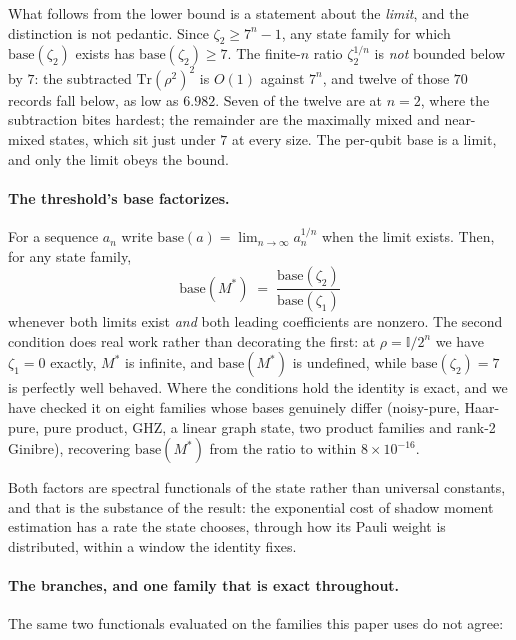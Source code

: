 \documentclass[a4paper,superscriptaddress,nofootinbib,onecolumn,nopdfoutputerror]{quantumarticle}
\begin{document}
What follows from the lower bound is a statement about the \emph{limit}, and the distinction
is not pedantic. Since \(\zeta_2 \ge 7^n - 1\), any state family for which
\(\mathrm{base}(\zeta_2)\) exists has \(\mathrm{base}(\zeta_2) \ge 7\). The finite-\(n\) ratio
\(\zeta_2^{1/n}\) is \emph{not} bounded below by \(7\): the subtracted \(\mathrm{Tr}(\rho^2)^2\)
is \(O(1)\) against \(7^n\), and twelve of those \(70\) records fall below, as low as
\(6.982\). Seven of the twelve are at \(n = 2\), where the subtraction bites hardest; the
remainder are the maximally mixed and near-mixed states, which sit just under \(7\) at every
size. The per-qubit base is a limit, and only the limit obeys the bound.

\paragraph{The threshold's base factorizes.}
For a sequence \(a_n\) write \(\mathrm{base}(a) = \lim_{n\to\infty} a_n^{1/n}\) when the limit
exists. Then, for any state family,
\[
\boxed{\;\mathrm{base}(M^*) \;=\; \frac{\mathrm{base}(\zeta_2)}{\mathrm{base}(\zeta_1)}\;}
\]
whenever both limits exist \emph{and} both leading coefficients are nonzero. The second
condition does real work rather than decorating the first: at \(\rho = \mathbb{I}/2^n\) we have
\(\zeta_1 = 0\) exactly, \(M^*\) is infinite, and \(\mathrm{base}(M^*)\) is undefined, while
\(\mathrm{base}(\zeta_2) = 7\) is perfectly well behaved. Where the conditions hold the identity
is exact, and we have checked it on eight families whose bases genuinely differ (noisy-pure,
Haar-pure, pure product, GHZ, a linear graph state, two product families and rank-2 Ginibre),
recovering \(\mathrm{base}(M^*)\) from the ratio to within \(8 \times 10^{-16}\).

Both factors are spectral functionals of the state rather than universal constants, and that is
the substance of the result: the exponential cost of shadow moment estimation has a rate the
state chooses, through how its Pauli weight is distributed, within a window the identity fixes.

\paragraph{The branches, and one family that is exact throughout.}
The same two functionals evaluated on the families this paper uses do not agree:
\end{document}
